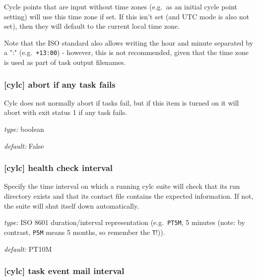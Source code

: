 Cycle points that are input without time zones (e.g.\ as an initial cycle
point
setting) will use this time zone if set. If this isn't set (and UTC mode is
also not set), then they will default to the current local time zone.

Note that the ISO standard also allows writing the hour and minute separated
by a ":" (e.g.\ \lstinline=+13:00=) - however, this is not recommended, given
that the time zone is used as part of task output filenames.

\subsubsection[abort if any task fails]{[cylc] \textrightarrow abort if any task fails}

Cylc does not normally abort if tasks fail, but if this item is turned
on it will abort with exit status 1 if any task fails.

\begin{myitemize}
    \item {\em type:} boolean
    \item {\em default:} False
\end{myitemize}

\subsubsection[health check interval]{[cylc] \textrightarrow health check interval}
\label{health-check-interval}

Specify the time interval on which a running cylc suite will check that its run
directory exists and that its contact file contains the expected information.
If not, the suite will shut itself down automatically.

\begin{myitemize}
    \item {\em type:} ISO 8601 duration/interval representation (e.g.\ 
 \lstinline=PT5M=, 5 minutes (note: by contrast, \lstinline=P5M= means 5
 months, so remember the \lstinline=T=!)).
    \item {\em default:} PT10M
\end{myitemize}

\subsubsection[task event mail interval]{[cylc] \textrightarrow task event mail interval}
\label{task-event-mail-interval}

